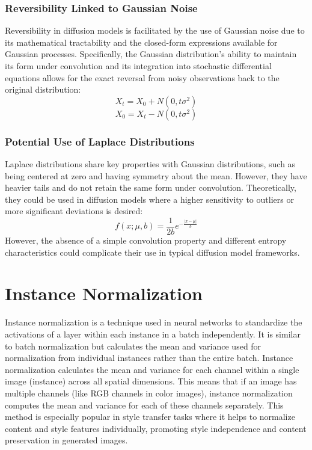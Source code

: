 \documentclass[12pt]{article}
\begin{document}
\subsubsection*{Reversibility Linked to Gaussian Noise}
Reversibility in diffusion models is facilitated by the use of Gaussian noise due to its mathematical tractability and the closed-form expressions available for Gaussian processes. Specifically, the Gaussian distribution's ability to maintain its form under convolution and its integration into stochastic differential equations allows for the exact reversal from noisy observations back to the original distribution:
\[
X_t = X_0 + N(0, t\sigma^2)
\]
\[
X_0 = X_t - N(0, t\sigma^2)
\]

\subsubsection*{Potential Use of Laplace Distributions}
Laplace distributions share key properties with Gaussian distributions, such as being centered at zero and having symmetry about the mean. However, they have heavier tails and do not retain the same form under convolution. Theoretically, they could be used in diffusion models where a higher sensitivity to outliers or more significant deviations is desired:
\[
f(x; \mu, b) = \frac{1}{2b} e^{-\frac{|x-\mu|}{b}}
\]
However, the absence of a simple convolution property and different entropy characteristics could complicate their use in typical diffusion model frameworks.

\section{Instance Normalization}

Instance normalization is a technique used in neural networks to standardize the activations of a layer within each instance in a batch independently. It is similar to batch normalization but calculates the mean and variance used for normalization from individual instances rather than the entire batch. Instance normalization calculates the mean and variance for each channel within a single image (instance) across all spatial dimensions. This means that if an image has multiple channels (like RGB channels in color images), instance normalization computes the mean and variance for each of these channels separately.
This method is especially popular in style transfer tasks where it helps to normalize content and style features individually, promoting style independence and content preservation in generated images.
\end{document}
